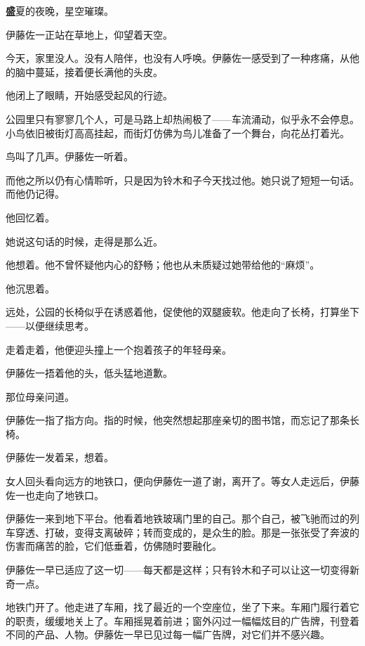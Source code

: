 
\AddSymbolsB
\pagecolor{cyan!10!gray}
\color{white}
\quad\quad \lettrine[,lraise=0.2,lhang=0.5]{\textbf{盛}}{夏}的夜晚，星空璀璨。

伊藤佐一正站在草地上，仰望着天空。

今天，家里没人。没有人陪伴，也没有人呼唤。伊藤佐一感受到了一种疼痛，从他的脑中蔓延，接着便长满他的头皮。

他闭上了眼睛，开始感受起风的行迹。

公园里只有寥寥几个人，可是马路上却热闹极了——车流涌动，似乎永不会停息。小鸟依旧被街灯高高挂起，而街灯仿佛为鸟儿准备了一个舞台，向花丛打着光。

鸟叫了几声。伊藤佐一听着。

而他之所以仍有心情聆听，只是因为铃木和子今天找过他。她只说了短短一句话。而他仍记得。

他回忆着。


她说这句话的时候，走得是那么近。

他想着。他不曾怀疑他内心的舒畅；他也从未质疑过她带给他的“麻烦”。

他沉思着。

远处，公园的长椅似乎在诱惑着他，促使他的双腿疲软。他走向了长椅，打算坐下——以便继续思考。

走着走着，他便迎头撞上一个抱着孩子的年轻母亲。

伊藤佐一捂着他的头，低头猛地道歉。

那位母亲问道。

伊藤佐一指了指方向。指的时候，他突然想起那座亲切的图书馆，而忘记了那条长椅。

伊藤佐一发着呆，想着。

女人回头看向远方的地铁口，便向伊藤佐一道了谢，离开了。等女人走远后，伊藤佐一也走向了地铁口。

伊藤佐一来到地下平台。他看着地铁玻璃门里的自己。那个自己，被飞驰而过的列车穿透、打破，变得支离破碎；转而变成的，是众生的脸。那是一张张受了奔波的伤害而痛苦的脸，它们低垂着，仿佛随时要融化。

伊藤佐一早已适应了这一切——每天都是这样；只有铃木和子可以让这一切变得新奇一点。

地铁门开了。他走进了车厢，找了最近的一个空座位，坐了下来。车厢门履行着它的职责，缓缓地关上了。车厢摇晃着前进；窗外闪过一幅幅炫目的广告牌，刊登着不同的产品、人物。伊藤佐一早已见过每一幅广告牌，对它们并不感兴趣。

